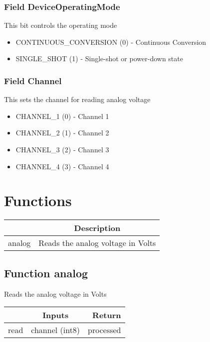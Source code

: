 \documentclass[a4paper,12pt,oneside,pdflatex,italian,final,twocolumn]{article}
\begin{document}
\raggedright

\subsubsection{Field DeviceOperatingMode }

This bit controls the operating mode


\begin{itemize}
\item CONTINUOUS\_CONVERSION (0) - Continuous Conversion
\item SINGLE\_SHOT (1) - Single-shot or power-down state
\end{itemize}


\raggedright

\subsubsection{Field Channel }

This sets the channel for reading analog voltage


\begin{itemize}
\item CHANNEL\_1 (0) - Channel 1
\item CHANNEL\_2 (1) - Channel 2
\item CHANNEL\_3 (2) - Channel 3
\item CHANNEL\_4 (3) - Channel 4
\end{itemize}




\raggedright

\section{Functions}

\centering
\begin{tabular}{lc}
\toprule
  & Description \\
\midrule
analog & Reads the analog voltage in Volts \\
\bottomrule
\end{tabular}


\raggedright
\subsection{Function analog }
Reads the analog voltage in Volts \\

\centering
\begin{tabular}{lcr}
\toprule
  & Inputs & Return \\
\midrule
read &
channel (int8)

&
processed
\\
\bottomrule
\end{tabular}



\raggedright
\end{document}
